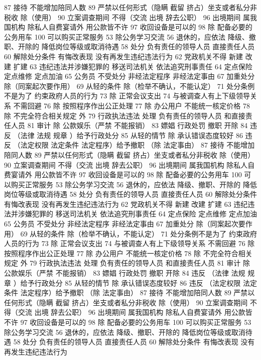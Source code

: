 \documentclass[cyan]{elegantnote}
\begin{document}
87 接待 不能增加陪同人数
89 严禁以任何形式（隐瞒 截留 挤占）坐支或者私分非税收
除（使用）
90 立案调查期间 不得（交流 出境 辞去公职）
96 出境期间 属我国机构 除私人自费宴请外 用公款皆不许
97 收回设备是可以的
98 除 配备必要的公务用车
100 可以购买正常服务
53 除公务学习交流
56 退休的，应依法
降级、撤职、开除的 降低岗位等级或取消待遇
58 处分
负有责任的领导人员
直接责任人员
60 解除处分条件
有悔改表现
没有再发生违纪违法行为
62 党政机关不得
新建 改建 扩建
63 违纪违法并涉嫌犯罪的
移送司法机关
依法追究刑事责任
64 定点保险 定点维修 定点加油
65 公务员 不受处分
非经法定程序
非经法定事由
67 加重处分
除（同案起次要作用）
69 从轻的条件
除（检举不确认，不能认定）
71 处分条例不是为了
约束政府人员的行为
73 除 正常会议支出
74 与被调查人有上下级领导关系 不需回避
76 除 按照程序作出公正处理
77 除 办公用户
不能统一核定价格
78 除 不完全符合相关规定 外
79 行政执法违法 处理
负有责任的领导人员
和直接责任人员
81 审计
除 公款娱乐（严禁 不能报销）
83 嫖娼 行政处罚
撤职 开除
84 违反 （法律 法规 规章 ）给予行政处分
85 从轻的情节
除 承认错误态度较好
86 违反 （法定权限 法定条件 法定程序）给予撤职
（除 法定事由）
87 接待 不能增加陪同人数
89 严禁以任何形式（隐瞒 截留 挤占）坐支或者私分非税收
除（使用）
90 立案调查期间 不得（交流 出境 辞去公职）
96 出境期间 属我国机构 除私人自费宴请外 用公款皆不许
97 收回设备是可以的
98 除 配备必要的公务用车
100 可以购买正常服务
53 除公务学习交流
56 退休的，应依法
降级、撤职、开除的 降低岗位等级或取消待遇
58 处分
负有责任的领导人员
直接责任人员
60 解除处分条件
有悔改表现
没有再发生违纪违法行为
62 党政机关不得
新建 改建 扩建
63 违纪违法并涉嫌犯罪的
移送司法机关
依法追究刑事责任
64 定点保险 定点维修 定点加油
65 公务员 不受处分
非经法定程序
非经法定事由
67 加重处分
除（同案起次要作用）
69 从轻的条件
除（检举不确认，不能认定）
71 处分条例不是为了
约束政府人员的行为
73 除 正常会议支出
74 与被调查人有上下级领导关系 不需回避
76 除 按照程序作出公正处理
77 除 办公用户
不能统一核定价格
78 除 不完全符合相关规定 外
79 行政执法违法 处理
负有责任的领导人员
和直接责任人员
81 审计
除 公款娱乐（严禁 不能报销）
83 嫖娼 行政处罚
撤职 开除
84 违反 （法律 法规 规章 ）给予行政处分
85 从轻的情节
除 承认错误态度较好
86 违反 （法定权限 法定条件 法定程序）给予撤职
（除 法定事由）
87 接待 不能增加陪同人数
89 严禁以任何形式（隐瞒 截留 挤占）坐支或者私分非税收
除（使用）
90 立案调查期间 不得（交流 出境 辞去公职）
96 出境期间 属我国机构 除私人自费宴请外 用公款皆不许
97 收回设备是可以的
98 除 配备必要的公务用车
100 可以购买正常服务
53 除公务学习交流
56 退休的，应依法
降级、撤职、开除的 降低岗位等级或取消待遇
58 处分
负有责任的领导人员
直接责任人员
60 解除处分条件
有悔改表现
没有再发生违纪违法行为
\end{document}
